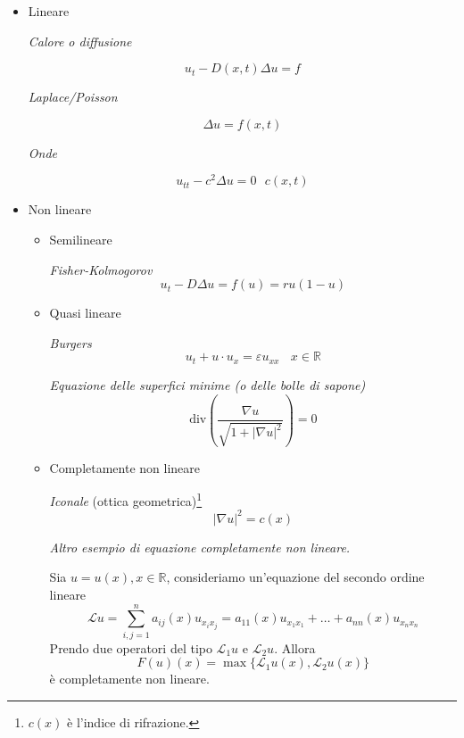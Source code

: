\documentclass[10pt,a4paper,twoside,openright]{book}
\begin{document}
\begin{itemize}
\item Lineare

\textit{Calore o diffusione}

\begin{equation*}
u_{t} -D(x,t) \Delta u=f
\end{equation*}

\textit{Laplace/Poisson}

\begin{equation*}
\Delta u=f(x,t)
\end{equation*}

\textit{Onde}

\begin{equation*}
u_{tt} -c^{2} \Delta u=0\ \ \ c(x,t)
\end{equation*}
\item Non lineare
\begin{itemize}
\item Semilineare

\textit{Fisher-Kolmogorov}
\begin{equation*}
u_{t} -D\Delta u=f(u) =ru(1-u)
\end{equation*}
\item Quasi lineare

\textit{Burgers}
\begin{equation*}
u_{t} +u\cdotp u_{x} =\varepsilon u_{xx} \ \ \ \ x\in \mathbb{R}
\end{equation*}

\textit{Equazione delle superfici minime (o delle bolle di sapone)}
\begin{equation*}
\mathrm{div}\left(\frac{\nabla u}{\sqrt{1+| \nabla u| ^{2}}}\right) =0
\end{equation*}
\item Completamente non lineare

\textit{Iconale} (ottica geometrica)\footnote{$c(x)$ è l'indice di rifrazione.}
\begin{equation*}
| \nabla u| ^{2} =c(x)
\end{equation*}

\textit{Altro esempio di equazione completamente non lineare.}

Sia $u=u(x),x\in \mathbb{R}$, consideriamo un'equazione del secondo ordine lineare
\begin{equation*}
\mathcal{L} u=\sum ^{n}_{i,j=1} a_{ij}(x) u_{x_{i} x_{j}} =a_{11}(x) u_{x_{1} x_{1}} +\dotsc +a_{nn}(x) u_{x_{n} x_{n}}
\end{equation*}Prendo due operatori del tipo $\mathcal{L}_{1} u$ e $\mathcal{L}_{2} u$. Allora
\begin{equation*}
F(u)(x) =\max\{\mathcal{L}_{1} u(x),\mathcal{L}_{2} u(x)\}
\end{equation*}è completamente non lineare.
\end{itemize}
\end{itemize}
\end{document}

